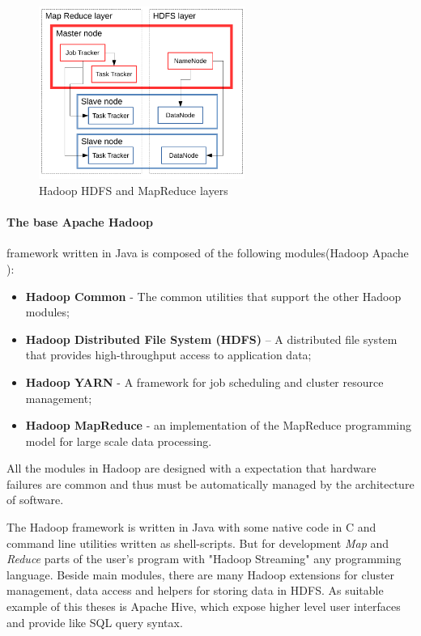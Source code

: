 \documentclass[a4paper,12pt,oneside]{report}
\begin{document}
 \begin{figure}[h!]
    \centering
    \includegraphics[width=0.6\textwidth]{./img/schema2.pdf}
    \caption[Hadoop architecture2]{\centering Hadoop HDFS and MapReduce layers}
 \end{figure} 
 
 
 
\paragraph*{The base Apache Hadoop}framework written in Java is composed of the following modules(Hadoop Apache \cite{hadoop_web}):
\begin{itemize}
\item \textbf{Hadoop Common} - The common utilities that support the other Hadoop modules;
\item \textbf{Hadoop Distributed File System (HDFS)} – A distributed file system that provides
 high-throughput access to application data;
\item \textbf{Hadoop YARN} - A framework for job scheduling and cluster resource management;
\item \textbf{Hadoop MapReduce} - an implementation of the MapReduce programming model 
for large scale data processing.
\end{itemize}
All the modules in Hadoop are designed with a expectation that hardware failures  are common and thus 
must be automatically managed by the architecture of  software.

The Hadoop framework is written in Java with some native code in C and command line utilities written 
as shell-scripts. But for development \textit{Map} and \textit{Reduce} parts of the user's program  
with "Hadoop Streaming" any programming language. 
Beside main modules, there are many Hadoop extensions for cluster management, 
data access and helpers for storing data in HDFS. As suitable example of this theses is Apache Hive, 
which expose higher level user interfaces and provide like SQL query syntax. 
\end{document}
